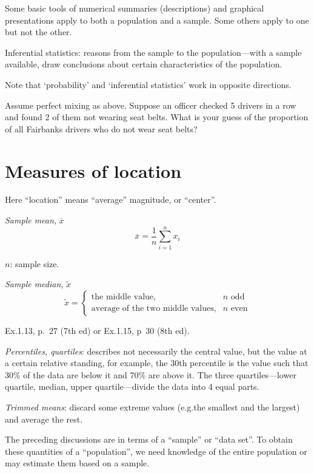 \documentclass[12pt]{article}
\begin{document}
Some basic tools of numerical summaries (descriptions) and graphical
presentations apply to both a population and a sample.
Some others apply to one but not the other.

Inferential statistics:
reasons from the sample to the population---with
a sample available, draw conclusions about certain characteristics of
the population.

Note that `probability' and `inferential statistics' work in opposite
directions.

\example Assume perfect mixing as above. Suppose an officer
checked 5 drivers in a row and found 2 of them not wearing seat belts.
What is your guess of the proportion of all Fairbanks drivers who do not
wear seat belts?

\section{Measures of location}

Here ``location'' means ``average'' magnitude, or ``center''.

\emph{Sample mean}, $\overline{x}$
\[
\overline{x} = \frac{1}{n}\sum_{i=1}^n x_i
\]

$n$: sample size.

\emph{Sample median}, $\tilde{x}$
\[
\tilde{x} =
    \begin{cases}
        \text{the middle value}, & \text{$n$ odd}\\
        \text{average of the two middle values}, & \text{$n$ even}
    \end{cases}
\]

\example Ex.\@ 1.13, p.~27 (7th ed) or Ex.\@ 1.15, p~30 (8th ed).


\emph{Percentiles, quartiles}: describes not necessarily the central
value, but the value at a certain relative standing, for example,
the 30th percentile is the value such that 30\% of the data
are below it and 70\% are above it.
The three quartiles---lower quartile, median, upper quartile---divide
the data into 4 equal parts.

\emph{Trimmed means}: discard some extreme values (e.g.\@ the smallest and
the largest) and average the rest.

The preceding discussions are in terms of a ``sample'' or ``data set''.
To obtain these quantities of a ``population'',
we need knowledge of the entire population
or may estimate them based on a sample.
\end{document}
